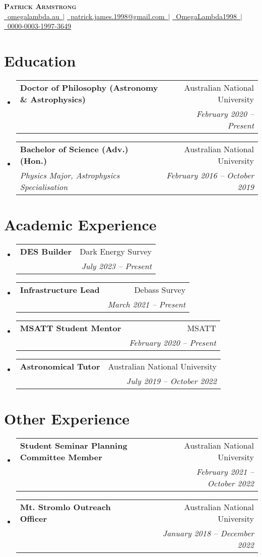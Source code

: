 \documentclass[letterpaper,11pt]{article}
\makeatletter
\newcommand{\resumeItem}[1]{
  \item\small{
    {#1 \vspace{-2pt}}
  }
}
\newcommand{\resumeSubheading}[4]{
  \vspace{-2pt}\item
    \begin{tabular*}{0.97\textwidth}[t]{l@{\extracolsep{\fill}}r}
      \textbf{#1} & #2 \\
      \textit{\small#3} & \textit{\small #4} \\
    \end{tabular*}\vspace{-7pt}
}
\newcommand{\resumeSubHeadingListStart}{\begin{itemize}[leftmargin=0.15in, label={}]}
\newcommand{\resumeSubHeadingListEnd}{\end{itemize}}
\newcommand{\resumeItemListStart}{\begin{itemize}}
\newcommand{\resumeItemListEnd}{\end{itemize}\vspace{-5pt}}
\newcommand{\insertName}{Patrick Armstrong}
\newcommand{\insertWebsite}{\href{https://www.omegalambda.au/}{\faIcon{globe}~\underline{omegalambda.au}~}}
\newcommand{\insertEmail}{\href{mailto:patrick.james.1998@gmail.com}{\faIcon{envelope}~\underline{patrick.james.1998@gmail.com}~}}
\newcommand{\insertGithub}{\href{https://www.github.com/OmegaLambda1998}{\faIcon{github}~\underline{OmegaLambda1998}~}}
\newcommand{\insertOrcid}{\href{https://www.orcid.org/000-003-1997-3649}{\faIcon{orcid}~\underline{0000-0003-1997-3649}}}
\newcommand{\educationElement}[4]{%
    \resumeSubHeadingListStart
        \resumeSubheading
            {#1}
            {#2}
            {#3}
            {#4}
    \resumeSubHeadingListEnd
}
\newcommand{\experienceElement}[5]{%
    \resumeSubHeadingListStart
        \resumeSubheading
            {#1}
            {#2}
            {\makecell[l]{#3}}
            {#4}
            {#5}
    \resumeSubHeadingListEnd
}
\makeatother
\begin{document}
\begin{center}
    \textbf{\Huge \scshape \insertName} \\ \vspace{2pt}
    \insertWebsite $|$ \insertEmail $|$ 
    \insertGithub $|$
    \insertOrcid
\end{center}


\section{Education}
  \educationElement{Doctor of Philosophy (Astronomy \& Astrophysics)}{Australian National University}{}{February 2020 -- Present}
  \educationElement{Bachelor of Science (Adv.) (Hon.)}{Australian National University}{Physics Major, Astrophysics Specialisation}{February 2016 -- October 2019}


\section{Academic Experience}

    \experienceElement{DES Builder}{Dark Energy Survey}{Develop \& maintain the~\href{https://github.com/dessn/Pippin}{\underline{Pippin}} pipeline, Internal review of DES papers, Organise \& host meetings.}{July 2023 -- Present}{}

    \experienceElement{Infrastructure Lead}{Debass Survey}{Develop \& maintain the~\href{https://www.mso.anu.edu.au/debass/}{\underline{DEBass Survey}} database and website.}{March 2021 -- Present}{}

    \experienceElement{MSATT Student Mentor}{MSATT}{Provide guidance and mentorship for highschool students completing astronomical projects.}{February 2020 -- Present}{}

    \experienceElement{Astronomical Tutor}{Australian National University}{Sole tutor for~\textit{Galaxies and Cosmology (ASTR3002)}.}{July 2019 -- October 2022}{}

\section{Other Experience}

    \experienceElement{Student Seminar Planning Committee Member}{Australian National University}{[2022]: Senior planning committee member, [2021]: Planning committee member}{February 2021 -- October 2022}{}

    \experienceElement{Mt. Stromlo Outreach Officer}{Australian National University}{Deliver high quality outreach experience for school groups and families}{January 2018 -- December 2022}{}
\end{document}
